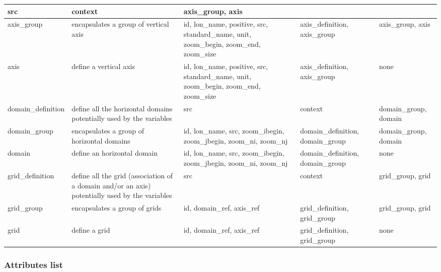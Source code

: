 \begin{longtable}{|p{2.2cm}|p{2.5cm}|p{3.5cm}|p{2.2cm}|p{1.6cm}|}
   src &
   context &  
   axis\_group, axis \\
   \hline   
   axis\_group & 
   encapsulates a group of vertical axis &
   id, lon\_name, positive, src, standard\_name, unit, zoom\_begin, zoom\_end, zoom\_size &
   axis\_definition, axis\_group & 
   axis\_group, axis \\
   \hline   
   axis & 
   define a vertical axis &
   id, lon\_name, positive, src, standard\_name, unit, zoom\_begin, zoom\_end, zoom\_size &
   axis\_definition, axis\_group  & 
   none \\
   \hline   
   \hline   
   domain\_\-definition & 
   define all the horizontal domains potentially used by the variables &
   src &
   context & 
   domain\_\-group, domain \\
   \hline   
   domain\_group & 
   encapsulates a group of horizontal domains &
   id, lon\_name, src, zoom\_ibegin, zoom\_jbegin, zoom\_ni, zoom\_nj &
   domain\_\-definition, domain\_group & 
   domain\_\-group, domain \\
   \hline   
   domain & 
   define an horizontal domain &
   id, lon\_name, src, zoom\_ibegin, zoom\_jbegin, zoom\_ni, zoom\_nj &
   domain\_\-definition, domain\_group & 
   none \\
   \hline   
   \hline   
   grid\_definition & 
   define all the grid (association of a domain and/or an axis) potentially used by the variables &
   src &
   context & 
   grid\_group, grid \\
   \hline   
   grid\_group & 
   encapsulates a group of grids &
   id, domain\_ref, axis\_ref &
   grid\_definition, grid\_group & 
   grid\_group, grid \\
   \hline   
   grid & 
   define a grid &
   id, domain\_ref, axis\_ref &
   grid\_definition, grid\_group & 
   none \\
   \hline   
\end{longtable}


\subsubsection{Attributes list}


